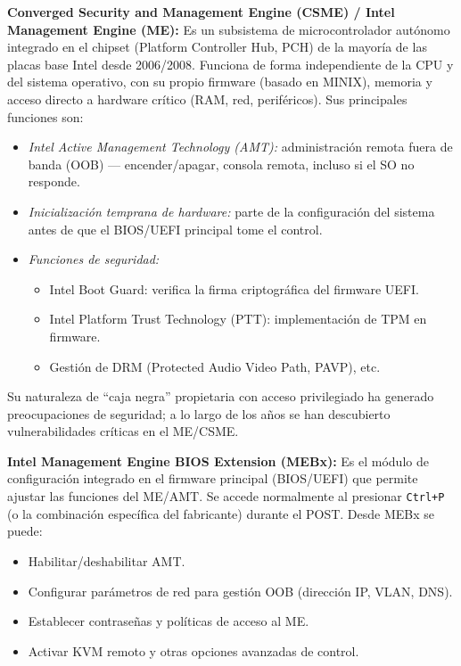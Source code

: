 \documentclass[a4paper,12pt]{article}
\begin{document}
\textbf{Converged Security and Management Engine (CSME) / Intel Management Engine (ME):}  
Es un subsistema de microcontrolador autónomo integrado en el chipset (Platform Controller Hub, PCH) de la mayoría de las placas base Intel desde 2006/2008. Funciona de forma independiente de la CPU y del sistema operativo, con su propio firmware (basado en MINIX), memoria y acceso directo a hardware crítico (RAM, red, periféricos). Sus principales funciones son:
\begin{itemize}[noitemsep]
  \item \emph{Intel Active Management Technology (AMT):} administración remota fuera de banda (OOB) — encender/apagar, consola remota, incluso si el SO no responde.
  \item \emph{Inicialización temprana de hardware:} parte de la configuración del sistema antes de que el BIOS/UEFI principal tome el control.
  \item \emph{Funciones de seguridad:}  
    \begin{itemize}[noitemsep]
      \item Intel Boot Guard: verifica la firma criptográfica del firmware UEFI.
      \item Intel Platform Trust Technology (PTT): implementación de TPM en firmware.
      \item Gestión de DRM (Protected Audio Video Path, PAVP), etc.
    \end{itemize}
\end{itemize}
Su naturaleza de “caja negra” propietaria con acceso privilegiado ha generado preocupaciones de seguridad; a lo largo de los años se han descubierto vulnerabilidades críticas en el ME/CSME.

\medskip
\textbf{Intel Management Engine BIOS Extension (MEBx):}  
Es el módulo de configuración integrado en el firmware principal (BIOS/UEFI) que permite ajustar las funciones del ME/AMT. Se accede normalmente al presionar \texttt{Ctrl+P} (o la combinación específica del fabricante) durante el POST. Desde MEBx se puede:
\begin{itemize}[noitemsep]
  \item Habilitar/deshabilitar AMT.
  \item Configurar parámetros de red para gestión OOB (dirección IP, VLAN, DNS).
  \item Establecer contraseñas y políticas de acceso al ME.
  \item Activar KVM remoto y otras opciones avanzadas de control.
\end{itemize}
\end{document}
